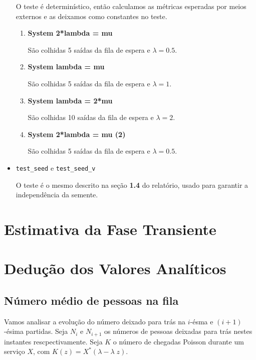 \documentclass[a4paper]{article}
\newcommand{\inlcode}{\texttt}
\begin{document}
\begin{itemize}
        O teste é determinístico, então
        calculamos as métricas esperadas
        por meios externos e
        as deixamos como constantes no teste.
        \begin{enumerate}
            \item \textbf{System 2*lambda = mu} \par
                São colhidas 5 saídas da fila de espera
                e \(\lambda = 0.5\).
            \item \textbf{System lambda = mu} \par
                São colhidas 5 saídas da fila de espera
                e \(\lambda = 1\).
            \item \textbf{System lambda = 2*mu} \par
                São colhidas 10 saídas da fila de espera
                e \(\lambda = 2\).
            \item \textbf{System 2*lambda = mu (2)} \par
                São colhidas 5 saídas da fila de espera
                e \(\lambda = 0.5\).
        \end{enumerate}
    \item \inlcode{test\_seed} e \inlcode{test\_seed\_v} \par
        O teste é o mesmo descrito
        na seção \textbf{1.4} do relatório,
        usado para garantir a independência da semente.
\end{itemize}

\newpage
\section{Estimativa da Fase Transiente}

\newpage
\section{Dedução dos Valores Analíticos}
\subsection{Número médio de pessoas na fila}
Vamos analisar a evolução do número
deixado para trás na \(i\)-ésma e \((i+1)\)-ésima partidas.
Seja \(N_i\) e  \(N_{i+1}\) os números de pessoas
deixadas para trás nestes instantes rescpectivamente.
Seja \(K\) o número de chegadas Poisson
durante um serviço \(X\),
com \(K(z) = X^*(\lambda - \lambda \; z)\).
\end{document}
